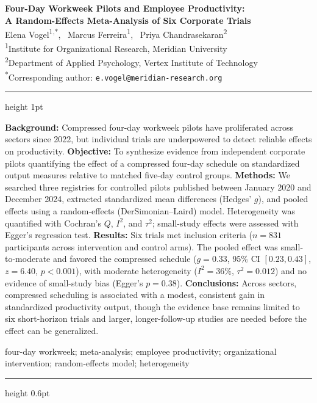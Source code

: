 \thispagestyle{fancy}

\begin{center}
  {\Large\bfseries\color{inknavy}
    Four-Day Workweek Pilots and Employee Productivity:\\[3pt]
    A Random-Effects Meta-Analysis of Six Corporate Trials}\\[10pt]
  {\large Elena Vogel\textsuperscript{1,*}, \, Marcus Ferreira\textsuperscript{1}, \, Priya Chandrasekaran\textsuperscript{2}}\\[5pt]
  {\small \textsuperscript{1}Institute for Organizational Research, Meridian University \\
   \textsuperscript{2}Department of Applied Psychology, Vertex Institute of Technology}\\[3pt]
  {\small \textsuperscript{*}Corresponding author: \texttt{e.vogel@meridian-research.org}}
\end{center}

\vspace{6pt}
{\color{bordergray}\hrule height 1pt}
\vspace{10pt}

\textbf{Background:} Compressed four-day workweek pilots have proliferated across sectors
since 2022, but individual trials are underpowered to detect reliable effects on
productivity. \textbf{Objective:} To synthesize evidence from independent corporate pilots
quantifying the effect of a compressed four-day schedule on standardized output measures
relative to matched five-day control groups. \textbf{Methods:} We searched three registries
for controlled pilots published between January 2020 and December 2024, extracted
standardized mean differences (Hedges' $g$), and pooled effects using a random-effects
(DerSimonian--Laird) model. Heterogeneity was quantified with Cochran's $Q$, $I^2$, and
$\tau^2$; small-study effects were assessed with Egger's regression test.
\textbf{Results:} Six trials met inclusion criteria ($n = 831$ participants across
intervention and control arms). The pooled effect was small-to-moderate and favored the
compressed schedule ($g = 0.33$, 95\% CI $[0.23, 0.43]$, $z = 6.40$, $p < 0.001$), with
moderate heterogeneity ($I^2 = 36\%$, $\tau^2 = 0.012$) and no evidence of small-study bias
(Egger's $p = 0.38$). \textbf{Conclusions:} Across sectors, compressed scheduling is
associated with a modest, consistent gain in standardized productivity output, though the
evidence base remains limited to six short-horizon trials and larger, longer-follow-up
studies are needed before the effect can be generalized.

\vspace{4pt}
 four-day workweek; meta-analysis;
employee productivity; organizational intervention; random-effects model; heterogeneity

\vspace{6pt}
{\color{bordergray}\hrule height 0.6pt}
\vspace{4pt}

